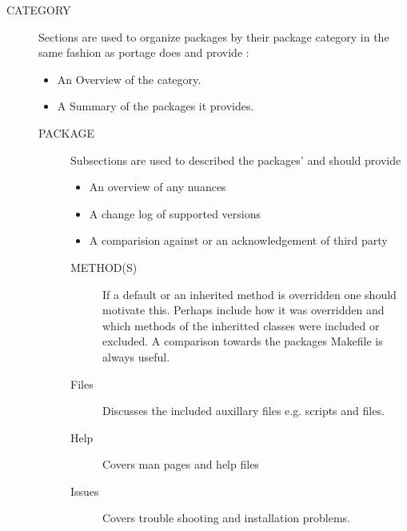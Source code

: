 \documentclass{article}
\begin{document}
\begin{description}
\item[CATEGORY]
Sections are used to organize packages by their package category in the same fashion as portage does and provide :
\begin{itemize}
\item An Overview of the category.
\item A Summary of the packages it provides.
\end{itemize}
\begin{description}
\item[PACKAGE]
Subsections are used to described the packages' \eBuild and should provide
\begin{itemize}
\item An overview of any nuances
\item A change log of supported versions
\item A comparision against or an acknowledgement of third party 
\end{itemize}
\begin{description}
\item[METHOD(S)] If a default or an inherited method is overridden one should motivate this.
Perhaps include how it was overridden and which methods of the inheritted classes were included or excluded.
A comparison towards the packages Makefile is always useful. 

\item[Files] Discusses the included auxillary files e.g.  scripts and  files.
\item[Help] Covers man pages and help files
\item[Issues] Covers trouble shooting and installation problems.
\end{description}
\end{description}
\end{description}
\end{document}
